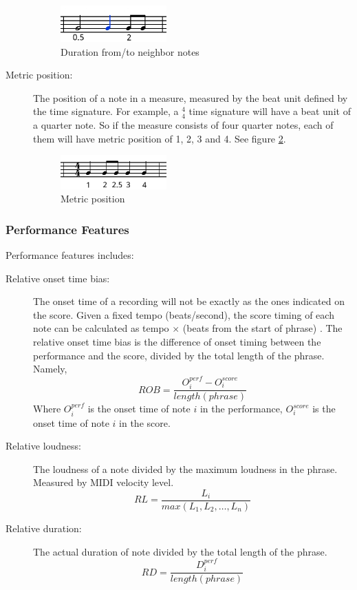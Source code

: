 \begin{description}
      \begin{figure}[htbp]
         \begin{center}
            \includegraphics[width=0.4\textwidth]{fig/duration}
         \end{center}
         \caption{Duration from/to neighbor notes}
         \label{fig:duration}
      \end{figure}
   \item [Metric position:] The position of a note in a measure, measured by the beat unit defined by the time signature. For example, a $^4_4$ time signature will have a beat unit of a quarter note. So if the measure consists of four quarter notes, each of them will have metric position of 1, 2, 3 and 4. See figure \ref{fig:metrical}.

   \begin{figure}[htbp]
      \begin{center}
         \includegraphics[width=0.4\textwidth]{fig/metrical}
      \end{center}
      \caption{Metric position}
      \label{fig:metrical}
   \end{figure}
      \end{description}

      \subsubsection{Performance Features}
      Performance features includes:
      \begin{description}
         \item [Relative onset time bias:] 
            The onset time of a recording will not be exactly as the ones indicated on the score. Given a fixed tempo (beats/second), the score timing of each note can be calculated as tempo $\times$ (beats from the start of phrase)  . The relative onset time bias is the difference of onset timing between the performance and the score, divided by the total length of the phrase. Namely,
            $$ ROB = \frac{O_i^{perf} - O_i^{score}  }{length(phrase)}$$ Where $O_i^{perf}$ is the onset time of note $i$ in the performance, $O_i^{score}$ is the onset time of note $i$ in the score. 
         \item [Relative loudness:] The loudness of a note divided by the maximum loudness in the phrase. Measured by MIDI velocity level.
            $$ RL = \frac{L_i}{max(L_1, L_2, \dots, L_n)}$$

         \item [Relative duration:]
            The actual duration of note divided by the total length of the phrase.
            $$ RD = \frac{ D_i^{perf}}{length(phrase)}$$
      \end{description}
